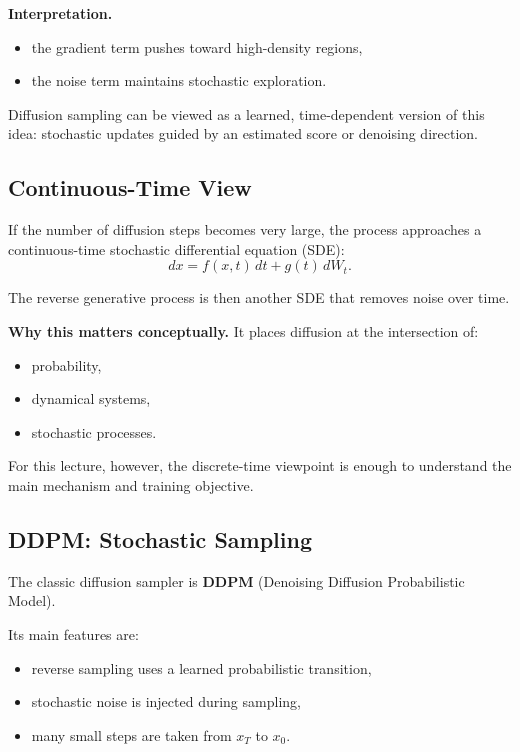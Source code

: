 \noindent
\textbf{Interpretation.}
\begin{itemize}
    \item the gradient term pushes toward high-density regions,
    \item the noise term maintains stochastic exploration.
\end{itemize}

\medskip

\noindent
Diffusion sampling can be viewed as a learned, time-dependent version of this idea: stochastic updates guided by an estimated score or denoising direction.

\subsection{Continuous-Time View}

If the number of diffusion steps becomes very large, the process approaches a continuous-time stochastic differential equation (SDE):
\[
dx = f(x,t)\,dt + g(t)\,dW_t.
\]

\medskip

\noindent
The reverse generative process is then another SDE that removes noise over time.

\medskip

\noindent
\textbf{Why this matters conceptually.}
It places diffusion at the intersection of:
\begin{itemize}
    \item probability,
    \item dynamical systems,
    \item stochastic processes.
\end{itemize}

\medskip

\noindent
For this lecture, however, the discrete-time viewpoint is enough to understand the main mechanism and training objective.

\subsection{DDPM: Stochastic Sampling}

The classic diffusion sampler is \textbf{DDPM} (Denoising Diffusion Probabilistic Model).

\medskip

\noindent
Its main features are:
\begin{itemize}
    \item reverse sampling uses a learned probabilistic transition,
    \item stochastic noise is injected during sampling,
    \item many small steps are taken from $x_T$ to $x_0$.
\end{itemize}

